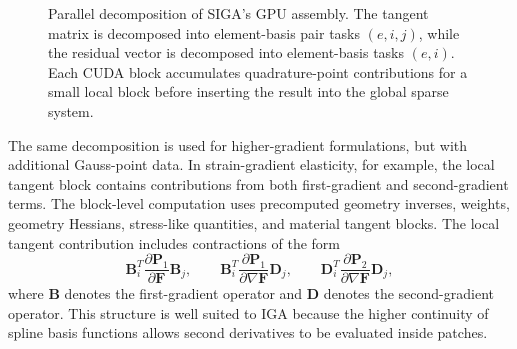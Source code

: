 \documentclass[11pt]{article}
\begin{document}
\begin{figure}[H]
{%
}
\caption{Parallel decomposition of SIGA's GPU assembly. The tangent matrix is decomposed into element-basis pair tasks \((e,i,j)\), while the residual vector is decomposed into element-basis tasks \((e,i)\). Each CUDA block accumulates quadrature-point contributions for a small local block before inserting the result into the global sparse system.}
\label{fig:parallel_assembly_decomposition}
\end{figure}
\FloatBarrier

The same decomposition is used for higher-gradient formulations, but with additional Gauss-point data. In strain-gradient elasticity, for example, the local tangent block contains contributions from both first-gradient and second-gradient terms. The block-level computation uses precomputed geometry inverses, weights, geometry Hessians, stress-like quantities, and material tangent blocks. The local tangent contribution includes contractions of the form
\[
    \mathbf{B}_i^{T}
    \frac{\partial \mathbf{P}_1}{\partial \mathbf{F}}
    \mathbf{B}_j,
    \qquad
    \mathbf{B}_i^{T}
    \frac{\partial \mathbf{P}_1}{\partial \nabla \mathbf{F}}
    \mathbf{D}_j,
    \qquad
    \mathbf{D}_i^{T}
    \frac{\partial \mathbf{P}_2}{\partial \nabla \mathbf{F}}
    \mathbf{D}_j ,
\]
where \(\mathbf{B}\) denotes the first-gradient operator and \(\mathbf{D}\) denotes the second-gradient operator. This structure is well suited to IGA because the higher continuity of spline basis functions allows second derivatives to be evaluated inside patches.
\end{document}
